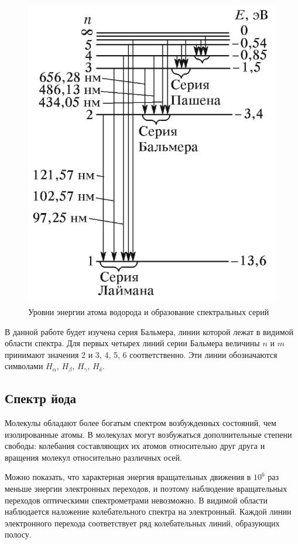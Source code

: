 \documentclass[14pt, a4paper]{report}
\begin{document}
\begin{figure}[H]
\centering
\includegraphics[scale=0.3]{../images/523-5}
\caption{Уровни энергии атома водорода и образование спектральных серий}
\end{figure}

В данной работе будет изучена серия Бальмера, линии которой лежат в видимой области спектра. Для первых четырех линий серии Бальмера величины  $n$ и $m$ принимают значения 2 и 3, 4, 5, 6 соответственно. Эти линии обозначаются символами $H_\alpha$, $H_\beta$, $H_\gamma$, $H_\delta$.

\subsection{Спектр йода}

Молекулы обладают более богатым спектром возбужденных состояний, чем изолированные атомы. В молекулах могут возбужаться дополнительные степени свободы: колебания составляющих их атомов относительно друг друга и вращения молекул относительно различных осей.

Можно показать, что характерная энергия вращательных движения в $10^6$ раз меньше энергии электронных переходов, и поэтому наблюдение вращательных переходов оптическими спектрометрами невозможно. В видимой области наблюдается наложение колебательного спектра на электронный. Каждой линии электронного перехода соответствует ряд колебательных линий, образующих полосу.
\end{document}
